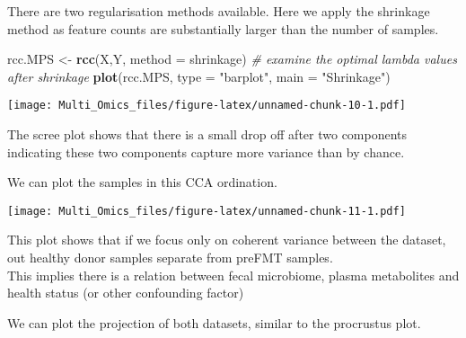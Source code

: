 \documentclass[
]{article}
\newenvironment{Shaded}{\begin{snugshade}}{\end{snugshade}}
\newcommand{\AttributeTok}[1]{\textcolor[rgb]{0.13,0.29,0.53}{#1}}
\newcommand{\CommentTok}[1]{\textcolor[rgb]{0.56,0.35,0.01}{\textit{#1}}}
\newcommand{\ConstantTok}[1]{\textcolor[rgb]{0.56,0.35,0.01}{#1}}
\newcommand{\DecValTok}[1]{\textcolor[rgb]{0.00,0.00,0.81}{#1}}
\newcommand{\FloatTok}[1]{\textcolor[rgb]{0.00,0.00,0.81}{#1}}
\newcommand{\FunctionTok}[1]{\textcolor[rgb]{0.13,0.29,0.53}{\textbf{#1}}}
\newcommand{\NormalTok}[1]{#1}
\newcommand{\OtherTok}[1]{\textcolor[rgb]{0.56,0.35,0.01}{#1}}
\newcommand{\SpecialCharTok}[1]{\textcolor[rgb]{0.81,0.36,0.00}{\textbf{#1}}}
\newcommand{\StringTok}[1]{\textcolor[rgb]{0.31,0.60,0.02}{#1}}
\begin{document}
There are two regularisation methods available. Here we apply the
shrinkage method as feature counts are substantially larger than the
number of samples.

\begin{Shaded}
\begin{Highlighting}[]
\NormalTok{rcc.MPS }\OtherTok{\textless{}{-}} \FunctionTok{rcc}\NormalTok{(X,Y, }\AttributeTok{method =} \StringTok{\textquotesingle{}shrinkage\textquotesingle{}}\NormalTok{) }
\CommentTok{\# examine the optimal lambda values after shrinkage }
\FunctionTok{plot}\NormalTok{(rcc.MPS, }\AttributeTok{type =} \StringTok{"barplot"}\NormalTok{, }\AttributeTok{main =} \StringTok{"Shrinkage"}\NormalTok{) }
\end{Highlighting}
\end{Shaded}

\texttt{[image: Multi\_Omics\_files/figure-latex/unnamed-chunk-10-1.pdf]}

The scree plot shows that there is a small drop off after two components
indicating these two components capture more variance than by chance.

We can plot the samples in this CCA ordination.

\begin{Shaded}
\end{Shaded}

\texttt{[image: Multi\_Omics\_files/figure-latex/unnamed-chunk-11-1.pdf]}

This plot shows that if we focus only on coherent variance between the
dataset, out healthy donor samples separate from preFMT samples.\\
This implies there is a relation between fecal microbiome, plasma
metabolites and health status (or other confounding factor)

We can plot the projection of both datasets, similar to the procrustus
plot.
\end{document}
